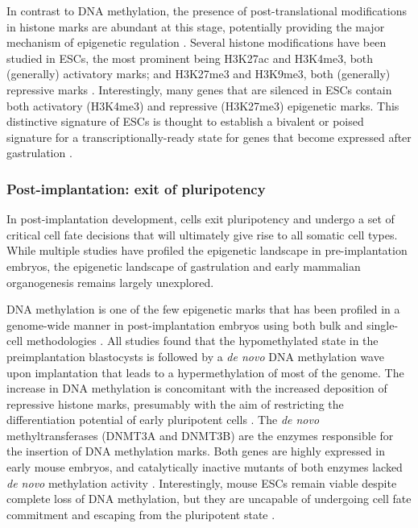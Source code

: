In contrast to DNA methylation, the presence of post-translational modifications in histone marks are abundant at this stage, potentially providing the major mechanism of epigenetic regulation \cite{Hanna2018,Tee2014}. Several histone modifications have been studied in ESCs, the most prominent being H3K27ac and H3K4me3, both (generally) activatory marks; and H3K27me3 and H3K9me3, both (generally) repressive marks \cite{Zhao2015}. Interestingly, many genes that are silenced in ESCs contain both activatory (H3K4me3) and repressive (H3K27me3) epigenetic marks. This distinctive signature of ESCs is thought to establish a bivalent or poised signature for a transcriptionally-ready state for genes that become expressed after gastrulation \cite{Bernstein2006,Tee2014}. 

\subsubsection{Post-implantation: exit of pluripotency}

In post-implantation development, cells exit pluripotency and undergo a set of critical cell fate decisions that will ultimately give rise to all somatic cell types. While multiple studies have profiled the epigenetic landscape in pre-implantation embryos, the epigenetic landscape of gastrulation and early mammalian organogenesis remains largely unexplored.

DNA methylation is one of the few epigenetic marks that has been profiled in a genome-wide manner in post-implantation embryos using both bulk and single-cell methodologies \cite{Auclair2014,Zhang2017,Dai2016,Rulands2018}. All studies found that the hypomethylated state in the preimplantation blastocysts is followed by a \textit{de novo} DNA methylation wave upon implantation that leads to a hypermethylation of most of the genome. The increase in DNA methylation is concomitant with the increased deposition of repressive histone marks, presumably with the aim of restricting the differentiation potential of early pluripotent cells \cite{Atlasi2017}. The \textit{de novo} methyltransferases (DNMT3A and DNMT3B) are the enzymes responsible for the insertion of DNA methylation marks. Both genes are highly expressed in early mouse embryos, and catalytically inactive mutants of both enzymes lacked \textit{de novo} methylation activity \cite{Auclair2014,Okano1999}. Interestingly, mouse ESCs remain viable despite complete loss of DNA methylation, but they are uncapable of undergoing cell fate commitment and escaping from the pluripotent state \cite{Tsumura2006}.

